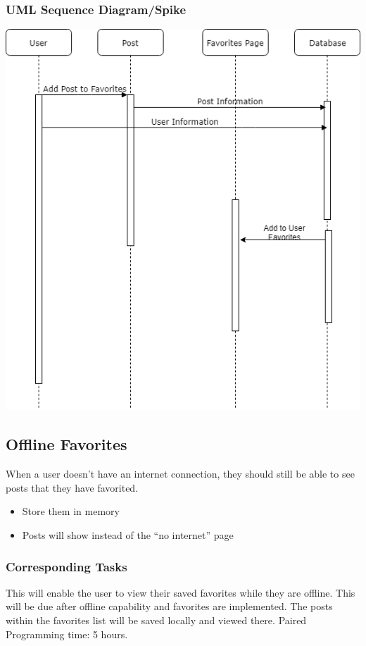 \documentclass[12pt]{article}
\begin{document}
\subsubsection{UML Sequence Diagram/Spike}
\includegraphics[scale=0.5]{img/8.png}\linebreak

\subsection{Offline Favorites}
When a user doesn’t have an internet connection, they should still be able to
see posts that they have favorited.
\begin{itemize}
  \item Store them in memory
  \item Posts will show instead of the “no internet” page
\end{itemize}
\subsubsection{Corresponding Tasks}
	This will enable the user to view their saved favorites while they are offline.  This will be due after offline capability and favorites are implemented.  The posts within the favorites list will be saved locally and viewed there.  Paired Programming time: 5 hours.
\end{document}
